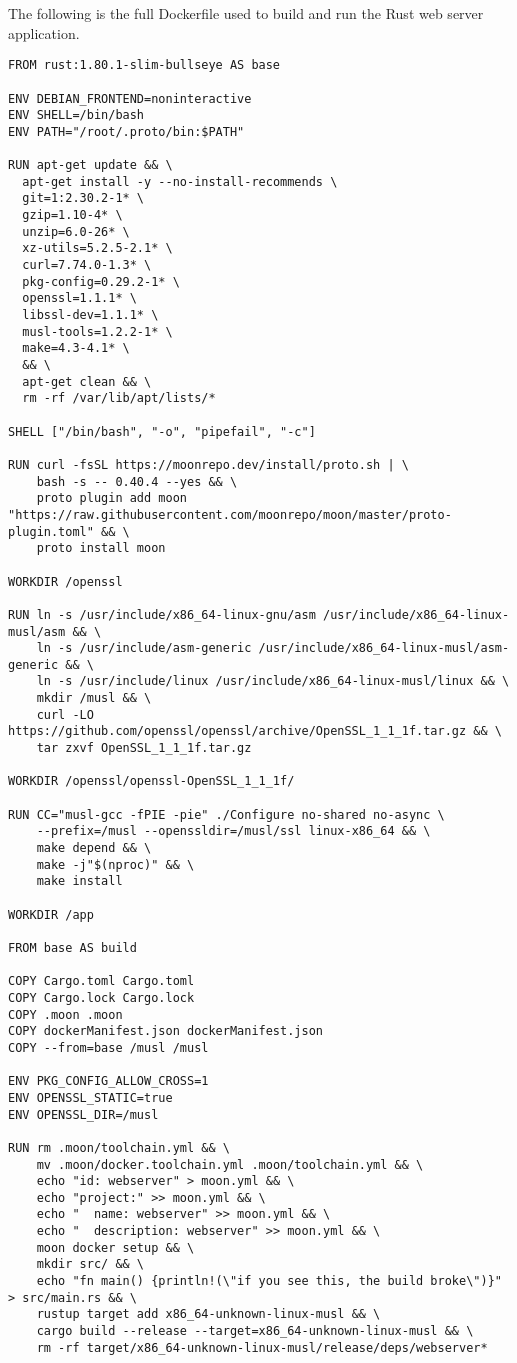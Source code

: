 The following is the full Dockerfile used to build and run the Rust web server application.

\label{appendix:docker:dockerfile}

\begin{lstlisting}[caption={Dockerfile for the Rust Web Server}, label=lst:dockerfile]
FROM rust:1.80.1-slim-bullseye AS base

ENV DEBIAN_FRONTEND=noninteractive
ENV SHELL=/bin/bash
ENV PATH="/root/.proto/bin:$PATH"

RUN apt-get update && \
  apt-get install -y --no-install-recommends \
  git=1:2.30.2-1* \
  gzip=1.10-4* \
  unzip=6.0-26* \
  xz-utils=5.2.5-2.1* \
  curl=7.74.0-1.3* \
  pkg-config=0.29.2-1* \
  openssl=1.1.1* \
  libssl-dev=1.1.1* \
  musl-tools=1.2.2-1* \
  make=4.3-4.1* \
  && \
  apt-get clean && \
  rm -rf /var/lib/apt/lists/*

SHELL ["/bin/bash", "-o", "pipefail", "-c"]

RUN curl -fsSL https://moonrepo.dev/install/proto.sh | \
    bash -s -- 0.40.4 --yes && \
    proto plugin add moon "https://raw.githubusercontent.com/moonrepo/moon/master/proto-plugin.toml" && \
    proto install moon

WORKDIR /openssl

RUN ln -s /usr/include/x86_64-linux-gnu/asm /usr/include/x86_64-linux-musl/asm && \
    ln -s /usr/include/asm-generic /usr/include/x86_64-linux-musl/asm-generic && \
    ln -s /usr/include/linux /usr/include/x86_64-linux-musl/linux && \
    mkdir /musl && \
    curl -LO https://github.com/openssl/openssl/archive/OpenSSL_1_1_1f.tar.gz && \
    tar zxvf OpenSSL_1_1_1f.tar.gz

WORKDIR /openssl/openssl-OpenSSL_1_1_1f/

RUN CC="musl-gcc -fPIE -pie" ./Configure no-shared no-async \
    --prefix=/musl --openssldir=/musl/ssl linux-x86_64 && \
    make depend && \
    make -j"$(nproc)" && \
    make install

WORKDIR /app

FROM base AS build

COPY Cargo.toml Cargo.toml
COPY Cargo.lock Cargo.lock
COPY .moon .moon
COPY dockerManifest.json dockerManifest.json
COPY --from=base /musl /musl

ENV PKG_CONFIG_ALLOW_CROSS=1
ENV OPENSSL_STATIC=true
ENV OPENSSL_DIR=/musl

RUN rm .moon/toolchain.yml && \
    mv .moon/docker.toolchain.yml .moon/toolchain.yml && \
    echo "id: webserver" > moon.yml && \
    echo "project:" >> moon.yml && \
    echo "  name: webserver" >> moon.yml && \
    echo "  description: webserver" >> moon.yml && \
    moon docker setup && \
    mkdir src/ && \
    echo "fn main() {println!(\"if you see this, the build broke\")}" > src/main.rs && \
    rustup target add x86_64-unknown-linux-musl && \
    cargo build --release --target=x86_64-unknown-linux-musl && \
    rm -rf target/x86_64-unknown-linux-musl/release/deps/webserver*


\end{lstlisting}
